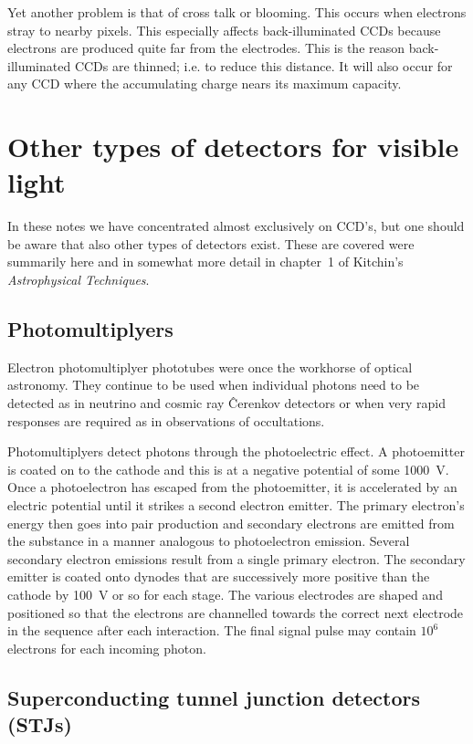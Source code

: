 Yet another problem is that of cross talk or blooming. This occurs when 
electrons stray to nearby pixels. This especially affects back-illuminated 
CCDs because electrons are produced quite far from the electrodes. This
is the reason back-illuminated CCDs are thinned; i.e. to reduce this 
distance. It will also occur for any CCD where the accumulating charge nears
its maximum capacity. 

\section{Other types of detectors for visible light}

In these notes we have concentrated almost exclusively on CCD's, but one should
be aware that also other types of detectors exist. These are covered were
summarily here and in somewhat more detail in chapter~1 of Kitchin's 
{\it Astrophysical Techniques}.

\subsection{Photomultiplyers}

Electron photomultiplyer phototubes were once the workhorse of optical 
astronomy. They continue to be used when individual photons need to be
detected  as in neutrino and cosmic ray \^Cerenkov detectors or when very
rapid responses are required as in observations of occultations.

Photomultiplyers detect photons through the photoelectric effect. A 
photoemitter is coated on to the cathode and this is at a negative potential
of some 1000~V. Once a photoelectron has escaped from the photoemitter, it
is accelerated by an electric potential until it strikes a second 
electron emitter. The primary electron's energy then goes into pair production
and secondary electrons are emitted from the substance in a manner analogous
to photoelectron emission. Several secondary electron emissions result 
from a single primary electron. The secondary emitter is coated onto dynodes
that are successively more positive than the cathode by 100~V or so for each
stage. The various electrodes are shaped and positioned so that the electrons
are channelled towards the correct next electrode in the sequence after 
each interaction. The final signal pulse may contain $10^6$ electrons for each
incoming photon. 

\subsection{Superconducting tunnel junction detectors (STJs)}

